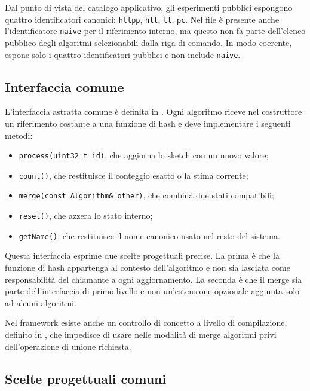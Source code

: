 Dal punto di vista del catalogo applicativo, gli esperimenti pubblici
espongono quattro identificatori canonici:
\texttt{hllpp}, \texttt{hll}, \texttt{ll}, \texttt{pc}. Nel file
 è presente anche l'identificatore \texttt{naive}
per il riferimento interno, ma questo non fa parte dell'elenco pubblico degli
algoritmi selezionabili dalla riga di comando. In modo coerente,
 espone solo i quattro identificatori
pubblici e non include \texttt{naive}.

\subsection{Interfaccia comune}

L'interfaccia astratta comune è definita in
. Ogni algoritmo riceve nel
costruttore un riferimento costante a una funzione di hash e deve implementare i
seguenti metodi:
\begin{itemize}
    \item \texttt{process(uint32\_t id)}, che aggiorna lo sketch con un nuovo
    valore;
    \item \texttt{count()}, che restituisce il conteggio esatto o la stima
    corrente;
    \item \texttt{merge(const Algorithm\& other)}, che combina due stati
    compatibili;
    \item \texttt{reset()}, che azzera lo stato interno;
    \item \texttt{getName()}, che restituisce il nome canonico usato nel resto
    del sistema.
\end{itemize}

Questa interfaccia esprime due scelte progettuali precise. La prima è che la
funzione di hash appartenga al contesto dell'algoritmo e non sia lasciata come
responsabilità del chiamante a ogni aggiornamento. La seconda è che il merge sia
parte dell'interfaccia di primo livello e non un'estensione opzionale aggiunta
solo ad alcuni algoritmi.

Nel framework esiste anche un controllo di concetto a livello di compilazione,
definito in , che
impedisce di usare nelle modalità di merge algoritmi privi dell'operazione di
unione richiesta.

\subsection{Scelte progettuali comuni}


